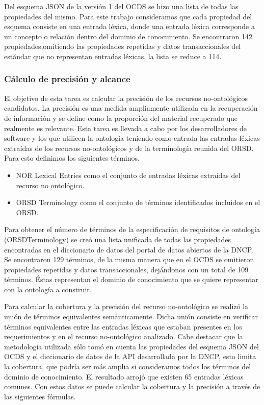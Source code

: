 Del esquema JSON de la versión 1 del OCDS se hizo una lista de todas las propiedades del mismo. Para este trabajo consideramos que cada propiedad del esquema consiste en una entrada léxica, donde una entrada léxica corresponde a un concepto o relación dentro del dominio de conocimiento. Se encontraron 142 propiedades,omitiendo las propiedades repetidas y datos transaccionales del estándar que no representan entradas léxicas, la lista se reduce a 114.

\subsubsection{Cálculo de precisión y alcance}

El objetivo de esta tarea es calcular la precisión de los recursos no-ontológicos candidatos. La precisión es una medida ampliamente utilizada en la recuperación de información y se define como la proporción del material recuperado que realmente es relevante. Esta tarea es llevada a cabo por los desarrolladores de software y los que utilicen la ontología teniendo como entrada las entradas léxicas extraídas de los recursos no-ontológicos y de la terminología reunida del ORSD. Para esto definimos los siguientes términos.

\begin{itemize}
    \item NOR Lexical Entries como el conjunto de entradas léxicas extraídas del recurso no ontológico.	
    \item ORSD Terminology como el conjunto de términos identificados incluidos en el ORSD. 
\end{itemize}
Para obtener el número de términos de la especificación de requisitos de ontología (ORSDTerminology) se creó una lista unificada de todas las propiedades encontradas en el diccionario de datos del portal de datos abiertos de la DNCP.  Se encontraron 129 términos, de la misma manera que en el OCDS se omitieron propiedades repetidas y datos transaccionales, dejándonos con un total de 109 términos. Éstas representan el dominio de conocimiento que se quiere representar con la ontología a construir.

Para calcular la cobertura y la precisión del recurso no-ontológico se realizó la unión de términos equivalentes semánticamente. Dicha unión consiste en verificar términos equivalentes entre las entradas léxicas que estaban presentes en los requerimientos y en el recurso no-ontológico analizado. Cabe destacar que la metodología utilizada sólo tomó en cuenta las propiedades del esquema JSON del OCDS y el diccionario de datos de la API desarrollada por la DNCP, esto limita la cobertura, que podría ser más amplia si consideramos todos los términos del dominio de conocimiento. El resultado arrojó que existen 65 entradas léxicas comunes. Con estos datos se puede calcular la cobertura y la precisión a través de las siguientes fórmulas.

